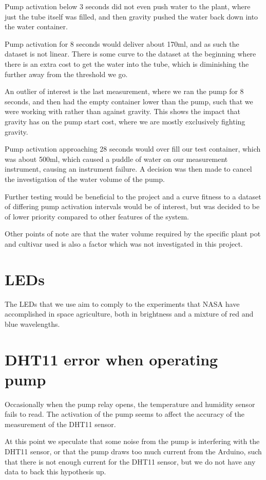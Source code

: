 \documentclass[12pt,a4paper,oneside]{book}
\begin{document}
Pump activation below 3 seconds did not even push water to the plant, where just the tube itself was filled, and then gravity pushed the water back down into the water container.

Pump activation for 8 seconds would deliver about 170ml, and as such the dataset is not linear. There is some curve to the dataset at the beginning where there is an extra cost to get the water into the tube, which is diminishing the further away from the threshold we go.

An outlier of interest is the last measurement, where we ran the pump for 8 seconds, and then had the empty container lower than the pump, such that we were working with rather than against gravity.
This shows the impact that gravity has on the pump start cost, where we are mostly exclusively fighting gravity.

Pump activation approaching 28 seconds would over fill our test container, which was about 500ml, which caused a puddle of water on our measurement instrument, causing an instrument failure. A decision was then made to cancel the investigation of the water volume of the pump.

Further testing would be beneficial to the project and a curve fitness to a dataset of differing pump activation intervals would be of interest, but was decided to be of lower priority compared to other features of the system.

Other points of note are that the water volume required by the specific plant pot and cultivar used is also a factor which was not investigated in this project.

\section{LEDs}
The LEDs that we use aim to comply to the experiments that NASA have accomplished in space agriculture, both in brightness and a mixture of red and blue wavelengths.

\section{DHT11 error when operating pump}
Occasionally when the pump relay opens, the temperature and humidity sensor fails to read.
The activation of the pump seems to affect the accuracy of the measurement of the DHT11 sensor.

At this point we speculate that some noise from the pump is interfering with the DHT11 sensor, or that the pump draws too much current from the Arduino, such that there is not enough current for the DHT11 sensor, but we do not have any data to back this hypothesis up.
\end{document}
